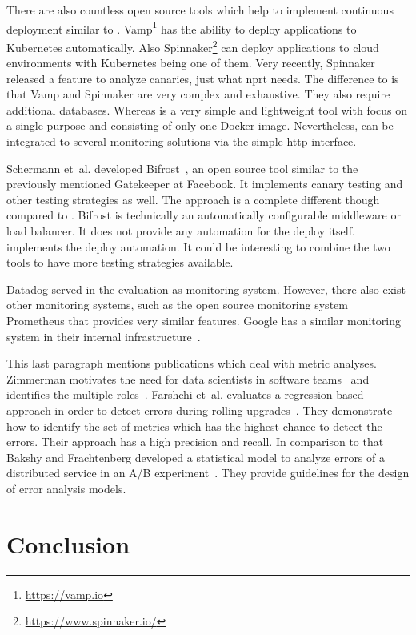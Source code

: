 There are also countless open source tools which help to implement continuous deployment
similar to \deployer{}. Vamp\footnote{\url{https://vamp.io}} has the ability to deploy
applications to Kubernetes automatically. Also
Spinnaker\footnote{\url{https://www.spinnaker.io/}} can deploy applications to cloud
environments with Kubernetes being one of them. Very recently, Spinnaker released a
feature to analyze canaries, just what \gls{nprt} needs. The difference to \deployer{}
is that Vamp and Spinnaker are very complex and exhaustive. They also require additional
databases. Whereas \deployer{} is a very simple and lightweight tool with focus on a single
purpose and consisting of only one Docker image. Nevertheless, \deployer{} can be integrated to
several monitoring solutions via the simple \gls{http} interface.

Schermann et~al. developed Bifrost~\cite{bifrost}, an open source tool similar to the
previously mentioned Gatekeeper at Facebook. It implements canary testing and other
testing strategies as well. The approach is a complete different though compared to
\deployer{}. Bifrost is technically an automatically configurable middleware or
load balancer. It does not provide any automation for the deploy itself. \deployer{}
implements the deploy automation. It could be interesting to combine the two tools to have
more testing strategies available.

Datadog served in the evaluation as monitoring system. However, there also exist other
monitoring systems, such as the open source monitoring system Prometheus that provides
very similar features. Google has a similar monitoring system in their internal
infrastructure~\cite{sre_monitoring}.

This last paragraph mentions publications which deal with metric analyses. Zimmerman
motivates the need for data scientists in software teams~\cite{data_science_role2} and
identifies the multiple roles~\cite{data_science_role}. Farshchi et~al. evaluates a
regression based approach in order to detect errors during rolling
upgrades~\cite{anomaly_detection}. They demonstrate how to identify the set of metrics
which has the highest chance to detect the errors. Their approach has a high precision
and recall. In comparison to that Bakshy and Frachtenberg developed a statistical model to
analyze errors of a distributed service in an A/B
experiment~\cite{error_analysis_of_distr_system}. They provide guidelines for the design
of error analysis models.

\chapter{Conclusion}
\label{chap:conclusion}

